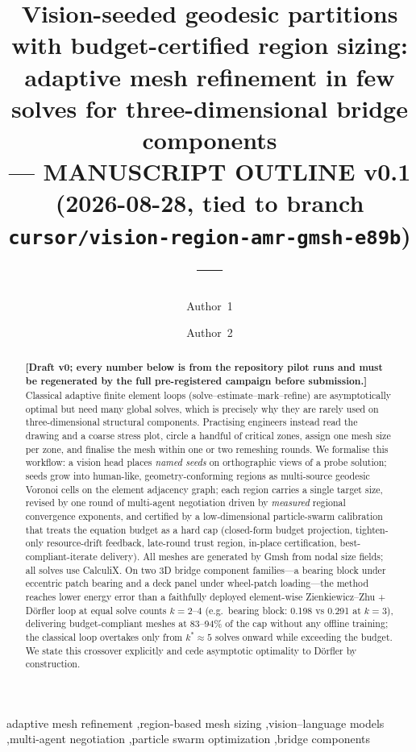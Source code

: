 \documentclass[preprint,12pt]{elsarticle}
\begin{document}
\begin{frontmatter}

\title{Vision-seeded geodesic partitions with budget-certified region sizing:
adaptive mesh refinement in few solves for three-dimensional bridge components\\
\vspace{0.5em}\normalsize --- MANUSCRIPT OUTLINE v0.1 (2026-08-28, tied to branch
\texttt{cursor/vision-region-amr-gmsh-e89b}) ---}

\author[a]{Author~1}
\author[a]{Author~2}
\address[a]{Affiliation placeholder, City, Country}

\begin{abstract}
\textbf{[Draft v0; every number below is from the repository pilot runs and must be
regenerated by the full pre-registered campaign before submission.]}
Classical adaptive finite element loops (solve--estimate--mark--refine) are
asymptotically optimal but need many global solves, which is precisely why they are
rarely used on three-dimensional structural components. Practising engineers instead
read the drawing and a coarse stress plot, circle a handful of critical zones, assign
one mesh size per zone, and finalise the mesh within one or two remeshing rounds. We
formalise this workflow: a vision head places \emph{named seeds} on orthographic views
of a probe solution; seeds grow into human-like, geometry-conforming regions as
multi-source geodesic Voronoi cells on the element adjacency graph; each region carries
a single target size, revised by one round of multi-agent negotiation driven by
\emph{measured} regional convergence exponents, and certified by a low-dimensional
particle-swarm calibration that treats the equation budget as a hard cap (closed-form
budget projection, tighten-only resource-drift feedback, late-round trust region,
in-place certification, best-compliant-iterate delivery). All meshes are generated by
Gmsh from nodal size fields; all solves use CalculiX. On two 3D bridge component
families---a bearing block under eccentric patch bearing and a deck panel under
wheel-patch loading---the method reaches lower energy error than a faithfully deployed
element-wise Zienkiewicz--Zhu + D\"orfler loop at equal solve counts $k=2$--$4$
(e.g.\ bearing block: 0.198 vs 0.291 at $k=3$), delivering budget-compliant meshes at
83--94\% of the cap without any offline training; the classical loop overtakes only
from $k^*\!\approx\!5$ solves onward while exceeding the budget. We state this
crossover explicitly and cede asymptotic optimality to D\"orfler by construction.
\end{abstract}

\begin{keyword}
adaptive mesh refinement \sep region-based mesh sizing \sep vision--language models
\sep multi-agent negotiation \sep particle swarm optimization \sep bridge components
\end{keyword}

\end{frontmatter}
\end{document}
